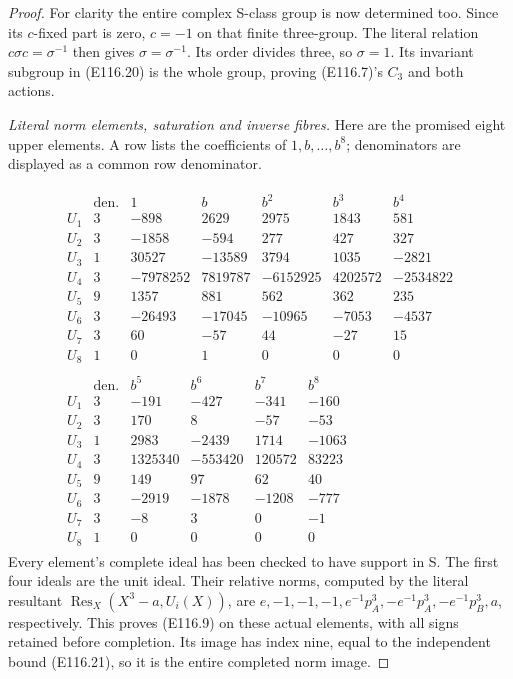 \begin{proof}
For clarity the entire complex S-class group is now
determined too. Since its $c$-fixed part is zero, $c=-1$
on that finite three-group. The literal relation
$c\sigma c=\sigma^{-1}$ then gives
$\sigma=\sigma^{-1}$. Its order divides three, so
$\sigma=1$. Its invariant subgroup in (E116.20) is the
whole group, proving (E116.7)'s $C_3$ and both actions.

\begin{samepage}
\emph{Literal norm elements, saturation and inverse fibres.}
Here are the promised eight upper elements. A row lists
the coefficients of $1,b,\ldots,b^8$; denominators are
displayed as a common row denominator.\par
\end{samepage}
\[
 \begin{gathered}
 \begin{array}{c|r|rrrrr}
  &\text{den.}&1&b&b^2&b^3&b^4\\ \hline
 U_1&3&-898&2629&2975&1843&581\\
 U_2&3&-1858&-594&277&427&327\\
 U_3&1&30527&-13589&3794&1035&-2821\\
 U_4&3&-7978252&7819787&-6152925&4202572&-2534822\\
 U_5&9&1357&881&562&362&235\\
 U_6&3&-26493&-17045&-10965&-7053&-4537\\
 U_7&3&60&-57&44&-27&15\\
 U_8&1&0&1&0&0&0
 \end{array}\\[.7em]
 \begin{array}{c|r|rrrr}
  &\text{den.}&b^5&b^6&b^7&b^8\\ \hline
 U_1&3&-191&-427&-341&-160\\
 U_2&3&170&8&-57&-53\\
 U_3&1&2983&-2439&1714&-1063\\
 U_4&3&1325340&-553420&120572&83223\\
 U_5&9&149&97&62&40\\
 U_6&3&-2919&-1878&-1208&-777\\
 U_7&3&-8&3&0&-1\\
 U_8&1&0&0&0&0
 \end{array}
 \end{gathered}
 \tag{E116.22}
\]
Every element's complete ideal has been checked to have
support in S. The first four ideals are the unit ideal.
Their relative norms, computed by the literal resultant
$\operatorname{Res}_X(X^3-a,U_i(X))$, are
$e,-1,-1,-1,e^{-1}p_A^3,-e^{-1}p_A^3,
-e^{-1}p_B^3,a$, respectively.
This proves (E116.9) on these actual elements, with all
signs retained before completion. Its image has index
nine, equal to the independent bound (E116.21), so it
is the entire completed norm image.


\end{proof}
